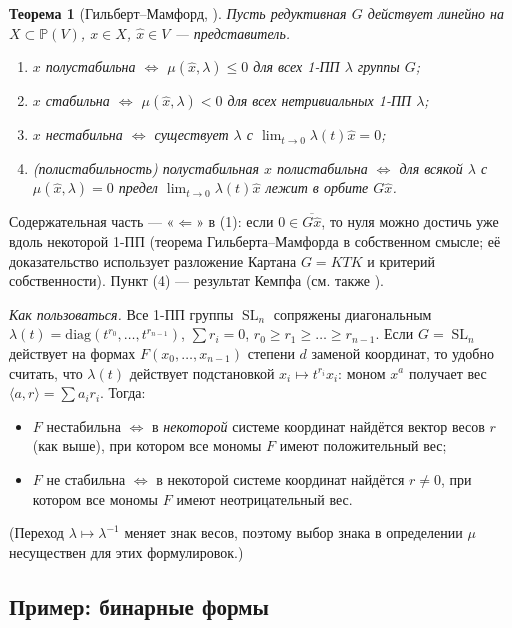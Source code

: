 \documentclass[11pt,a4paper]{article}
\theoremstyle{plain}
\newtheorem{theorem}{Теорема}[section]
\theoremstyle{definition}
\theoremstyle{remark}
\newcommand{\PP}{\mathbb{P}}
\DeclareMathOperator{\SL}{SL}
\begin{document}
\begin{theorem}[{Гильберт--Мамфорд, \cite[2.1]{MFK}}]\label{thm:HM}
Пусть редуктивная $G$ действует линейно на $X\subset\PP(V)$, $x\in X$, $\hat x\in V$ --- представитель.
\begin{enumerate}
\item $x$ полустабильна $\iff$ $\mu(\hat x,\lambda)\le0$ для всех 1-ПП $\lambda$ группы $G$;
\item $x$ стабильна $\iff$ $\mu(\hat x,\lambda)<0$ для всех нетривиальных 1-ПП $\lambda$;
\item $x$ нестабильна $\iff$ существует $\lambda$ с $\lim_{t\to0}\lambda(t)\hat x=0$;
\item (\emph{полистабильность}) полустабильная $x$ полистабильна $\iff$ для всякой $\lambda$ с
$\mu(\hat x,\lambda)=0$ предел $\lim_{t\to0}\lambda(t)\hat x$ лежит в орбите $G\hat x$.
\end{enumerate}
\end{theorem}

Содержательная часть --- «$\Leftarrow$» в (1): если $0\in\overline{G\hat x}$, то нуля можно
достичь уже вдоль некоторой 1-ПП (теорема Гильберта--Мамфорда в собственном смысле; её
доказательство использует разложение Картана $G=KTK$ и критерий собственности). Пункт (4) ---
результат Кемпфа \cite{Kempf} (см. также \cite{BMRT}).

\emph{Как пользоваться.} Все 1-ПП группы $\SL_{n}$ сопряжены диагональным
$\lambda(t)=\mathrm{diag}(t^{r_0},\dots,t^{r_{n-1}})$, $\sum r_i=0$, $r_0\ge r_1\ge\dots\ge r_{n-1}$.
Если $G=\SL_n$ действует на формах $F(x_0,\dots,x_{n-1})$ степени $d$ заменой координат, то
удобно считать, что $\lambda(t)$ действует подстановкой $x_i\mapsto t^{r_i}x_i$: моном $x^a$
получает вес $\langle a,r\rangle=\sum a_ir_i$. Тогда:
\begin{itemize}
\item $F$ нестабильна $\iff$ в \emph{некоторой} системе координат найдётся вектор весов $r$ (как
выше), при котором все мономы $F$ имеют положительный вес;
\item $F$ не стабильна $\iff$ в некоторой системе координат найдётся $r\ne0$, при котором все мономы
$F$ имеют неотрицательный вес.
\end{itemize}
(Переход $\lambda\mapsto\lambda^{-1}$ меняет знак весов, поэтому выбор знака в определении $\mu$
несуществен для этих формулировок.)

\subsection{Пример: бинарные формы}
\end{document}
